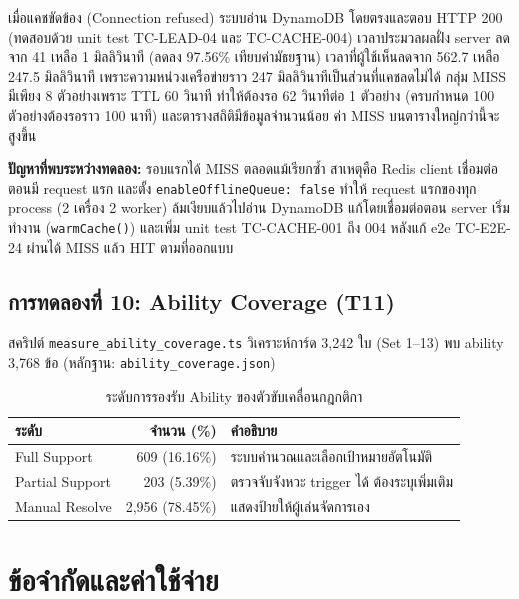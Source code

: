\documentclass[12pt,a4paper]{report}
\begin{document}
เมื่อแคชขัดข้อง (Connection refused) ระบบอ่าน DynamoDB โดยตรงและตอบ HTTP 200 (ทดสอบด้วย unit test TC-LEAD-04 และ TC-CACHE-004) เวลาประมวลผลฝั่ง server ลดจาก 41 เหลือ 1 มิลลิวินาที (ลดลง 97.56\% เทียบค่ามัธยฐาน) เวลาที่ผู้ใช้เห็นลดจาก 562.7 เหลือ 247.5 มิลลิวินาที เพราะความหน่วงเครือข่ายราว 247 มิลลิวินาทีเป็นส่วนที่แคชลดไม่ได้ กลุ่ม MISS มีเพียง 8 ตัวอย่างเพราะ TTL 60 วินาที ทำให้ต้องรอ 62 วินาทีต่อ 1 ตัวอย่าง (ครบกำหนด 100 ตัวอย่างต้องรอราว 100 นาที) และตารางสถิติมีข้อมูลจำนวนน้อย ค่า MISS บนตารางใหญ่กว่านี้จะสูงขึ้น

\textbf{ปัญหาที่พบระหว่างทดลอง:} รอบแรกได้ MISS ตลอดแม้เรียกซ้ำ สาเหตุคือ Redis client เชื่อมต่อตอนมี request แรก และตั้ง \texttt{enableOfflineQueue: false} ทำให้ request แรกของทุก process (2 เครื่อง \texttimes{} 2 worker) ล้มเงียบแล้วไปอ่าน DynamoDB แก้โดยเชื่อมต่อตอน server เริ่มทำงาน (\texttt{warmCache()}) และเพิ่ม unit test TC-CACHE-001 ถึง 004 หลังแก้ e2e TC-E2E-24 ผ่านได้ MISS แล้ว HIT ตามที่ออกแบบ

\section{การทดลองที่ 10: Ability Coverage (T11)}

สคริปต์ \nolinkurl{measure_ability_coverage.ts} วิเคราะห์การ์ด 3,242 ใบ (Set 1--13) พบ ability 3,768 ข้อ (หลักฐาน: \texttt{ability\_coverage.json})

\begin{table}[H]
\centering
\caption{ระดับการรองรับ Ability ของตัวขับเคลื่อนกฎกติกา}
\begin{tabularx}{\textwidth}{lrX}
\toprule
\textbf{ระดับ} & \textbf{จำนวน (\%)} & \textbf{คำอธิบาย} \\
\midrule
Full Support & 609 (16.16\%) & ระบบคำนวณและเลือกเป้าหมายอัตโนมัติ \\
Partial Support & 203 (5.39\%) & ตรวจจับจังหวะ trigger ได้ ต้องระบุเพิ่มเติม \\
Manual Resolve & 2,956 (78.45\%) & แสดงป้ายให้ผู้เล่นจัดการเอง \\
\bottomrule
\end{tabularx}
\end{table}

\chapter{ข้อจำกัดและค่าใช้จ่าย}
\end{document}
